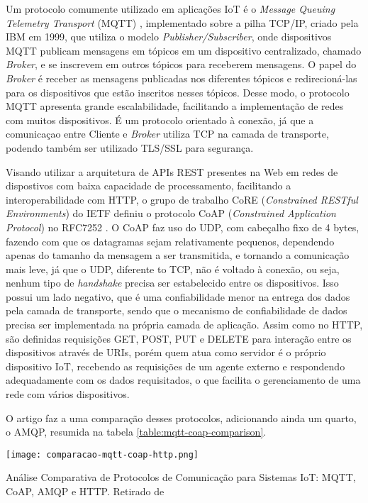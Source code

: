 \documentclass[../monografia.tex]{subfiles}
\begin{document}
Um protocolo comumente utilizado em aplicações IoT é o \textit{Message Queuing Telemetry Transport} (MQTT) \cite{mqtt-specification}, implementado sobre a pilha TCP/IP, criado pela IBM em 1999, que utiliza o modelo \textit{Publisher/Subscriber}, onde dispositivos MQTT publicam mensagens em tópicos em um dispositivo centralizado, chamado \textit{Broker}, e se inscrevem em outros tópicos para receberem mensagens. O papel do \textit{Broker} é receber as mensagens publicadas nos diferentes tópicos e redirecioná-las para os dispositivos que estão inscritos nesses tópicos. Desse modo, o protocolo MQTT apresenta grande escalabilidade, facilitando a implementação de redes com muitos dispositivos. É um protocolo orientado à conexão, já que a comunicaçao entre Cliente e \textit{Broker} utiliza TCP na camada de transporte, podendo também ser utilizado TLS/SSL para segurança. 

Visando utilizar a arquitetura de APIs REST presentes na Web em redes de dispostivos com baixa capacidade de processamento, facilitando a interoperabilidade com HTTP, o grupo de trabalho CoRE (\textit{Constrained RESTful Environments}) do IETF definiu o protocolo CoAP (\textit{Constrained Application Protocol}) no RFC7252 \cite{coap-specification}. O CoAP faz uso do UDP, com cabeçalho fixo de 4 bytes, fazendo com que os datagramas sejam relativamente pequenos, dependendo apenas do tamanho da mensagem a ser transmitida, e tornando a comunicação mais leve, já que o UDP, diferente to TCP, não é voltado à conexão, ou seja, nenhum tipo de \textit{handshake} precisa ser estabelecido entre os dispositivos. Isso possui um lado negativo, que é uma confiabilidade menor na entrega dos dados pela camada de transporte, sendo que o mecanismo de confiabilidade de dados precisa ser implementada na própria camada de aplicação. Assim como no HTTP, são definidas requisições GET, POST, PUT e DELETE para interação entre os dispositivos através de URIs, porém quem atua como servidor é o próprio dispositivo IoT, recebendo as requisições de um agente externo e respondendo adequadamente com os dados requisitados, o que facilita o gerenciamento de uma rede com vários dispositivos. 

O artigo \cite{mqtt-coap-comparison} faz a uma comparação desses protocolos, adicionando ainda um quarto, o AMQP, resumida na tabela \ref{table:mqtt-coap-comparison}.

\begin{table}[h]
\centering
\texttt{[image: comparacao-mqtt-coap-http.png]}
\caption{Análise Comparativa de Protocolos de Comunicação para Sistemas IoT: MQTT, CoAP, AMQP e HTTP. Retirado de \cite{mqtt-coap-comparison}}
\label{table:mqtt-coap-comparison}
\end{table}
\end{document}
